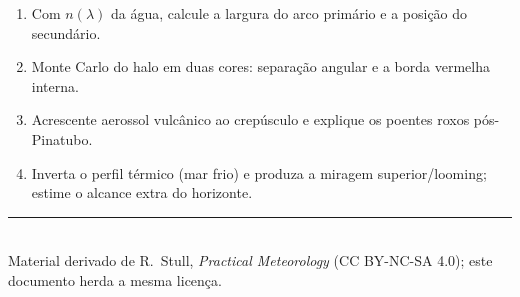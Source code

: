 \documentclass[11pt]{article}
\begin{document}
\begin{enumerate}[label=\textbf{N\arabic*.},itemsep=4pt]
  \item Com $n(\lambda)$ da água, calcule a largura do arco primário
        e a posição do secundário.
  \item Monte Carlo do halo em duas cores: separação angular e a
        borda vermelha interna.
  \item Acrescente aerossol vulcânico ao crepúsculo e explique os
        poentes roxos pós-Pinatubo.
  \item Inverta o perfil térmico (mar frio) e produza a miragem
        superior/looming; estime o alcance extra do horizonte.
\end{enumerate}

\vspace{1em}
\noindent\rule{\linewidth}{0.4pt}\\
{\scriptsize Material derivado de R.~Stull, \emph{Practical Meteorology}
(CC BY-NC-SA 4.0); este documento herda a mesma licença.}
\end{document}
